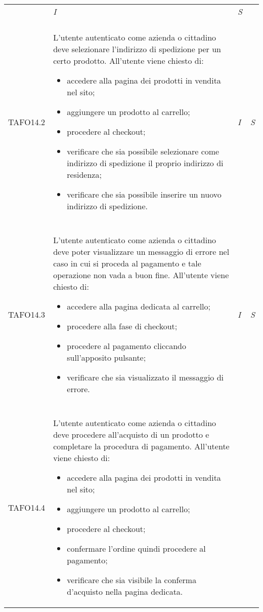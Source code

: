 \begin{longtable}{ >{\centering}p{} >{}p{}
			>{\centering}p{} >{\centering}p{}}
\begin{itemize}
		 \end{itemize} & \textit{I} & \textit{S}\\ \tabularnewline
\hypertarget{TAFO14.2}{TAFO14.2} & L'utente autenticato come azienda o cittadino deve selezionare l'indirizzo di
		 spedizione per un certo prodotto. All'utente viene chiesto di:
		 \begin{itemize}
		 	\item accedere alla pagina dei prodotti in vendita nel sito;
		 	\item aggiungere un prodotto al carrello;
		 	\item procedere al checkout;
		 	\item verificare che sia possibile selezionare come indirizzo di
		 	spedizione il proprio indirizzo di residenza;
		 	\item verificare che sia possibile inserire un nuovo indirizzo di
		 	spedizione.
		 \end{itemize} & \textit{I} & \textit{S}\\ \tabularnewline
\hypertarget{TAFO14.3}{TAFO14.3} & L'utente autenticato come azienda o cittadino deve poter visualizzare un
		 messaggio di errore nel caso in cui si proceda al pagamento e tale operazione non vada a buon fine. All'utente viene chiesto di:
		 \begin{itemize}
		 	\item accedere alla pagina dedicata al carrello;
		 	\item procedere alla fase di checkout;
		 	\item procedere al pagamento cliccando sull'apposito pulsante;
		 	\item verificare che sia visualizzato il messaggio di errore.
		 \end{itemize} & \textit{I} & \textit{S}\\ \tabularnewline
\hypertarget{TAFO14.4}{TAFO14.4}	&	L'utente autenticato come azienda o cittadino deve procedere all'acquisto di un prodotto e completare la procedura di pagamento. All'utente viene chiesto di:
		 \begin{itemize}
		 	\item accedere alla pagina dei prodotti in vendita nel sito;
		 	\item aggiungere un prodotto al carrello;
		 	\item procedere al checkout;
		 	\item confermare l'ordine quindi procedere al pagamento;
		 	\item verificare che sia visibile la conferma d'acquisto nella pagina dedicata.

\end{itemize}
\end{longtable}
